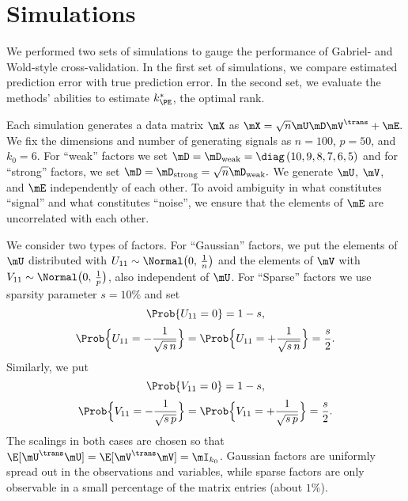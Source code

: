 \clearpage

\section{Simulations}

We performed two sets of simulations to gauge the performance of Gabriel- and Wold-style cross-validation.  In the first set of simulations, we compare estimated prediction error with true prediction error.  In the second set, we evaluate the methods' abilities to estimate $k_\PE^\ast$, the optimal rank.

Each simulation generates a data matrix $\mX$ as 
\(
    \mX = \sqrt{n} \mU \mD \mV^\trans + \mE.
\)
We fix the dimensions and number of generating signals as $n = 100$, $p = 50$,
and $k_0 = 6$.  For ``weak'' factors we set 
\(
    \mD 
    = 
    \mD_\text{weak}
    =
    \diag \left(
        10, 9, 8, 7, 6, 5
    \right)
\)
and for ``strong'' factors, we set
\(
    \mD
    =
    \mD_\text{strong}
    =
    \sqrt{n} \mD_\text{weak}.
\)
We generate $\mU$, $\mV$, and $\mE$ independently of each other.  To avoid 
ambiguity in what constitutes ``signal'' and what constitutes ``noise'', we 
ensure that the elements of $\mE$ are uncorrelated with each other.

We consider two types of factors.  For ``Gaussian'' factors, we put the elements of $\mU$ distributed \iid with
$U_{11} \sim \Normal\big( 0, \, \frac{1}{n} \big)$ and the elements of
$\mV$ \iid with $V_{11} \sim \Normal\big( 0, \, \frac{1}{p} \big)$, also independent of $\mU$.  For ``Sparse'' factors we use sparsity parameter $s = 10\%$ and set
\[
    \Prob\{ U_{11} = 0 \} = 1 - s,
\]
\[
    \Prob\Big\{ U_{11} = -\frac{1}{\sqrt{s \, n}} \Big\}
    =
    \Prob\Big\{ U_{11} = +\frac{1}{\sqrt{s \, n}} \Big\}    
    = 
    \frac{s}{2}.
\]
Similarly, we put
\[
    \Prob\{ V_{11} = 0 \} = 1 - s,
\]
\[
    \Prob\Big\{ V_{11} = -\frac{1}{\sqrt{s \, p}} \Big\}
    =
    \Prob\Big\{ V_{11} = +\frac{1}{\sqrt{s \, p}} \Big\}    
    = 
    \frac{s}{2}.
\]
The scalings in both cases are chosen so that $\E [\mU^\trans \mU] = \E 
[\mV^\trans \mV] = \mI_{k_0}$.  Gaussian factors are uniformly spread out in the observations and variables, while sparse factors are only observable in a small percentage of the matrix entries (about $1\%$).

